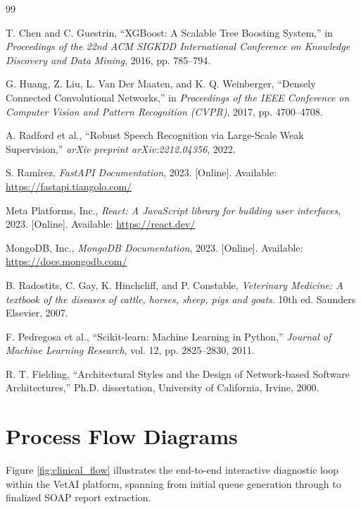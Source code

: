 \documentclass[a4paper,12pt]{report}
\begin{document}
\newpage
{}
\begin{thebibliography}{99}

T. Chen and C. Guestrin, ``XGBoost: A Scalable Tree Boosting System,'' in \textit{Proceedings of the 22nd ACM SIGKDD International Conference on Knowledge Discovery and Data Mining}, 2016, pp. 785--794.

G. Huang, Z. Liu, L. Van Der Maaten, and K. Q. Weinberger, ``Densely Connected Convolutional Networks,'' in \textit{Proceedings of the IEEE Conference on Computer Vision and Pattern Recognition (CVPR)}, 2017, pp. 4700--4708.

A. Radford et al., ``Robust Speech Recognition via Large-Scale Weak Supervision,'' \textit{arXiv preprint arXiv:2212.04356}, 2022.

S. Ramírez, \textit{FastAPI Documentation}, 2023. [Online]. Available: \url{https://fastapi.tiangolo.com/}

Meta Platforms, Inc., \textit{React: A JavaScript library for building user interfaces}, 2023. [Online]. Available: \url{https://react.dev/}

MongoDB, Inc., \textit{MongoDB Documentation}, 2023. [Online]. Available: \url{https://docs.mongodb.com/}

B. Radostits, C. Gay, K. Hinchcliff, and P. Constable, \textit{Veterinary Medicine: A textbook of the diseases of cattle, horses, sheep, pigs and goats}. 10th ed. Saunders Elsevier, 2007.

F. Pedregosa et al., ``Scikit-learn: Machine Learning in Python,'' \textit{Journal of Machine Learning Research}, vol. 12, pp. 2825--2830, 2011.

R. T. Fielding, ``Architectural Styles and the Design of Network-based Software Architectures,'' Ph.D. dissertation, University of California, Irvine, 2000.

\end{thebibliography}

\appendix
\chapter{Process Flow Diagrams}
Figure \ref{fig:clinical_flow} illustrates the end-to-end interactive diagnostic loop within the VetAI platform, spanning from initial queue generation through to finalized SOAP report extraction.
\end{document}
